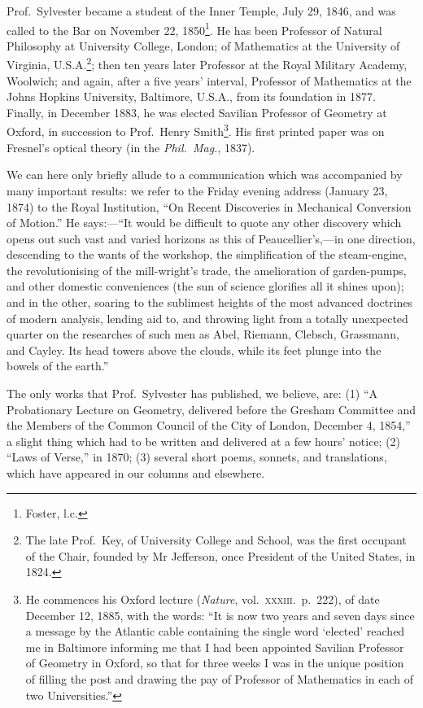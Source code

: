 \documentclass[11pt,a4paper]{article}
\begin{document}
Prof.\ Sylvester became a student of the Inner Temple, July 29, 1846, and was called to the Bar on November 22, 1850\footnote{Foster, l.c.}. He has been Professor of Natural Philosophy at University College, London; of Mathematics at the University of Virginia, U.S.A.\footnote{The late Prof.\ Key, of University College and School, was the first occupant of the Chair, founded by Mr Jefferson, once President of the United States, in 1824.}; then ten years later Professor at the Royal Military Academy, Woolwich; and again, after a five years' interval, Professor of Mathematics at the Johns Hopkins University, Baltimore, U.S.A., from its foundation in 1877. Finally, in December 1883, he was elected Savilian Professor of Geometry at Oxford, in succession to Prof.\ Henry Smith\footnote{He commences his Oxford lecture (\emph{Nature}, vol.\ \textsc{xxxiii}.\ p.\ 222), of date December 12, 1885, with the words: ``It is now two years and seven days since a message by the Atlantic cable containing the single word `elected' reached me in Baltimore informing me that I had been appointed Savilian Professor of Geometry in Oxford, so that for three weeks I was in the unique position of filling the post and drawing the pay of Professor of Mathematics in each of two Universities.''}. His first printed paper was on Fresnel's optical theory (in the \emph{Phil.\ Mag.}, 1837).

We can here only briefly allude to a communication which was accompanied by many important results: we refer to the Friday evening address (January 23, 1874) to the Royal Institution, ``On Recent Discoveries in Mechanical Conversion of Motion.'' He says:---``It would be difficult to quote any other discovery which opens out such vast and varied horizons as this of Peaucellier's,---in one direction, descending to the wants of the workshop, the simplification of the steam-engine, the revolutionising of the mill-wright's trade, the amelioration of garden-pumps, and other domestic conveniences (the sun of science glorifies all it shines upon); and in the other, soaring to the sublimest heights of the most advanced doctrines of modern analysis, lending aid to, and throwing light from a totally unexpected quarter on the researches of such men as Abel, Riemann, Clebsch, Grassmann, and Cayley. Its head towers above the clouds, while its feet plunge into the bowels of the earth.''

The only works that Prof.\ Sylvester has published, we believe, are: (1) ``A Probationary Lecture on Geometry, delivered before the Gresham Committee and the Members of the Common Council of the City of London, December 4, 1854,'' a slight thing which had to be written and delivered at a few hours' notice; (2) ``Laws of Verse,'' in 1870; (3) several short poems, sonnets, and translations, which have appeared in our columns and elsewhere.
\end{document}

